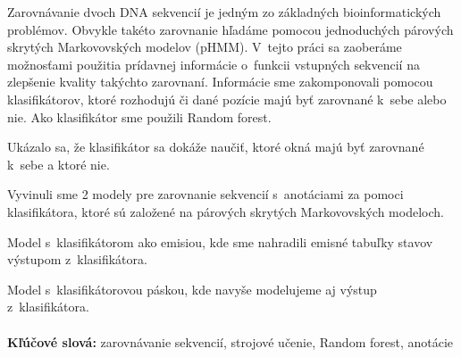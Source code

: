 Zarovnávanie dvoch DNA sekvencií je jedným zo základných
bioinformatických problémov. Obvykle takéto zarovnanie hľadáme pomocou jednoduchých párových skrytých
Markovovských modelov (pHMM). V~tejto práci sa zaoberáme možnosťami použitia prídavnej informácie o~funkcii vstupných sekvencií na zlepšenie kvality takýchto zarovnaní.
Informácie sme zakomponovali pomocou klasifikátorov, ktoré rozhodujú či dané pozície majú byť zarovnané k~sebe alebo nie. Ako klasifikátor sme použili Random forest.

Ukázalo sa, že klasifikátor sa dokáže naučiť, ktoré okná majú byť zarovnané k~sebe a ktoré nie.

Vyvinuli sme 2 modely pre zarovnanie sekvencií s~anotáciami za pomoci klasifikátora, ktoré sú založené na párových skrytých Markovovských modeloch.

Model s~klasifikátorom ako emisiou, kde sme nahradili emisné tabuľky stavov výstupom z~klasifikátora.

Model s~klasifikátorovou páskou, kde navyše modelujeme aj výstup z~klasifikátora.
\\ \\
{\bf Kľúčové slová:} zarovnávanie sekvencií, strojové učenie, Random forest, anotácie

